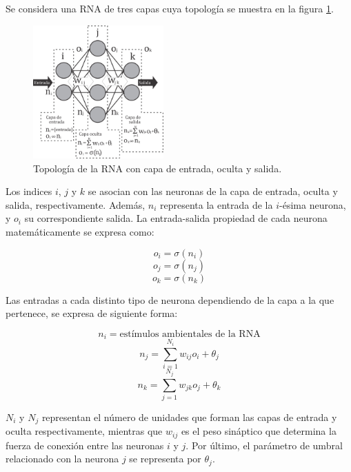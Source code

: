 Se considera una RNA de tres capas cuya topolog\'ia se
muestra en la figura \ref{fig:percep}.  

\begin{figure}[H]
	\centering
	\includegraphics[width=5cm]{img/fig_perceptron.png}
	\caption{Topolog\'ia de la RNA con capa de entrada, oculta y salida.}
	\label{fig:percep}
\end{figure}

Los indices $i$, $j$ y $k$ se asocian con las neuronas de la capa
de entrada, oculta y salida, respectivamente. Adem\'as, $n_i$ representa
la entrada de la $i$-\'esima neurona, y $o_i$ su correspondiente
salida. La entrada-salida propiedad de cada neurona
matem\'aticamente se expresa como: 

\begin{equation}
	o_i=\sigma(n_i)
	\label{entrada}
\end{equation}
\begin{equation}
	o_j=\sigma(n_j)
	\label{oculta}
\end{equation}
\begin{equation}
	o_k=\sigma(n_k)
	\label{salida}
\end{equation}

Las entradas a cada distinto tipo de neurona dependiendo
de la capa a la que pertenece, se expresa de siguiente forma:

\begin{equation}
	n_i=\text{est\'imulos ambientales de la RNA} \label{estimulo}
\end{equation}
\begin{equation}
	n_j=\sum^{N_i}_{i=1}w_{ij}o_i+\theta_j
\end{equation}
\begin{equation}
	n_k=\sum^{N_j}_{j=1}w_{jk}o_j+\theta_k
\end{equation}

$N_i$ y $N_j$ representan el n\'umero de unidades que forman
las capas de entrada y oculta respectivamente, mientras que
$w_{ij}$ es el peso sin\'aptico que determina la fuerza de conexi\'on
entre las neuronas $i$ y $j$. Por \'ultimo, el par\'ametro de umbral
relacionado con la neurona $j$ se representa por $\theta_j$.

